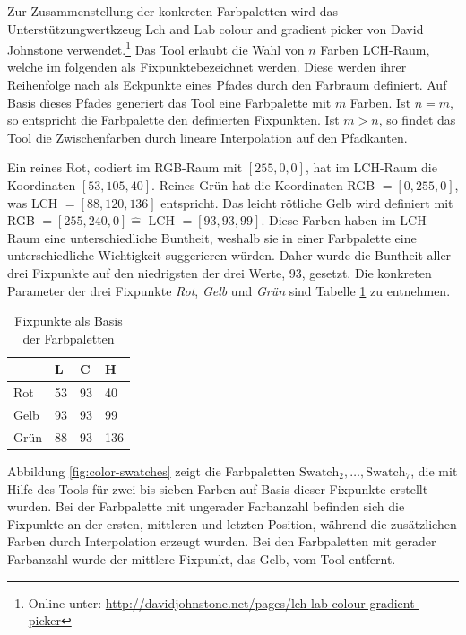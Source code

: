 Zur Zusammenstellung der konkreten Farbpaletten wird das Unterstützungwertkzeug \glqq Lch and Lab colour and gradient picker\grqq{} von David Johnstone verwendet.\footnote{Online unter: \url{http://davidjohnstone.net/pages/lch-lab-colour-gradient-picker}} Das Tool erlaubt die Wahl von $n$ Farben LCH-Raum, welche im folgenden als \glqq Fixpunkte\grqq bezeichnet werden. Diese werden ihrer Reihenfolge nach als Eckpunkte eines Pfades durch den Farbraum definiert. Auf Basis dieses Pfades generiert das Tool eine Farbpalette mit $m$ Farben. Ist $n = m$, so entspricht die Farbpalette den definierten Fixpunkten. Ist $m > n$, so findet das Tool die Zwischenfarben durch lineare Interpolation auf den Pfadkanten.

Ein \glqq reines Rot\grqq, codiert im RGB-Raum mit $[255,0,0]$, hat im LCH-Raum die Koordinaten $[53,105,40]$. \glqq Reines Grün\grqq{} hat die Koordinaten RGB $=[0,255,0]$, was LCH $= [88,120,136]$ entspricht. Das \glqq leicht rötliche Gelb\grqq{} wird definiert mit RGB $=[255,240,0] \hat{=}$ LCH $= [93,93,99]$. Diese Farben haben im LCH Raum eine unterschiedliche Buntheit, weshalb sie in einer Farbpalette eine unterschiedliche Wichtigkeit suggerieren würden.\cite{bigman} Daher wurde die Buntheit aller drei Fixpunkte auf den niedrigsten der drei Werte, $93$, gesetzt. Die konkreten Parameter der drei Fixpunkte \emph{Rot}, \emph{Gelb} und \emph{Grün} sind Tabelle \ref{tab:fixpoints} zu entnehmen. 

\begin{table}[h]
\centering
\caption{Fixpunkte als Basis der Farbpaletten}
\label{tab:fixpoints}
\begin{tabular}{@{}llll@{}}
\toprule
                                     & L      & C     & H      \\ \midrule
Rot   & 53     & 93    & 40     \\
Gelb  & 93     & 93    & 99     \\
Grün  & 88     & 93    & 136    \\ \bottomrule
\end{tabular}
\end{table}

Abbildung \ref{fig:color-swatches} zeigt die Farbpaletten $\text{Swatch}_2, \ldots, \text{Swatch}_7$, die mit Hilfe des Tools für zwei bis sieben Farben auf Basis dieser Fixpunkte erstellt wurden. Bei der Farbpalette mit ungerader Farbanzahl befinden sich die Fixpunkte an der ersten, mittleren und letzten Position, während die zusätzlichen Farben durch Interpolation erzeugt wurden. Bei den Farbpaletten mit gerader Farbanzahl wurde der mittlere Fixpunkt, das Gelb, vom Tool entfernt.

